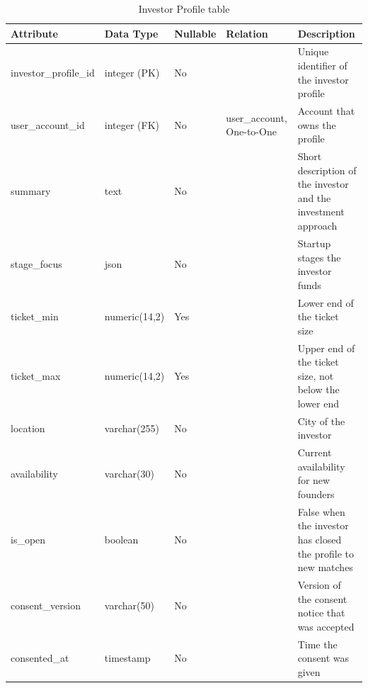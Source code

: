 \documentclass{FastFyp}
\newcommand{\ddhead}{\hline \textbf{Attribute} & \textbf{Data Type} & \textbf{Nullable} & \textbf{Relation} & \textbf{Description} \\ \hline}
\begin{document}
\begin{table}[!ht]
\centering
\caption{Investor Profile table}
\label{tab:dd-investor-profile}
\begin{tabular}{|p{3.2cm}|p{2.5cm}|p{1.4cm}|p{2.9cm}|p{4.0cm}|}
\ddhead
investor\_profile\_id & integer (PK) & No &  & Unique identifier of the investor profile \\ \hline
user\_account\_id & integer (FK) & No & user\_account, One-to-One & Account that owns the profile \\ \hline
summary & text & No &  & Short description of the investor and the investment approach \\ \hline
stage\_focus & json & No &  & Startup stages the investor funds \\ \hline
ticket\_min & numeric(14,2) & Yes &  & Lower end of the ticket size \\ \hline
ticket\_max & numeric(14,2) & Yes &  & Upper end of the ticket size, not below the lower end \\ \hline
location & varchar(255) & No &  & City of the investor \\ \hline
availability & varchar(30) & No &  & Current availability for new founders \\ \hline
is\_open & boolean & No &  & False when the investor has closed the profile to new matches \\ \hline
consent\_version & varchar(50) & No &  & Version of the consent notice that was accepted \\ \hline
consented\_at & timestamp & No &  & Time the consent was given \\ \hline
\end{tabular}
\end{table}

\FloatBarrier
\end{document}
